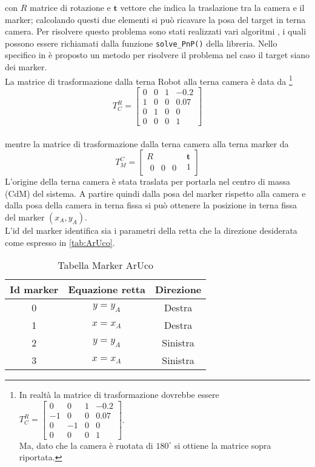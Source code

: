   con $R$ matrice di rotazione e $ \boldsymbol{t}$ vettore che indica la traslazione tra la camera e il marker; calcolando questi due elementi si può ricavare la 
  posa del target in terna camera. Per risolvere questo problema sono stati realizzati vari algoritmi \cite{marchand2015pose}, i quali possono essere richiamati dalla 
  funzione \texttt{solve\_PnP()} della libreria. Nello specifico in \cite{infinitesimal} è proposto un metodo per risolvere il problema nel caso il target siano dei
  marker. \\
  La matrice di trasformazione dalla terna Robot alla terna camera è data da \footnote{In realtà la matrice di trasformazione dovrebbe essere $T^R_C = \begin{bmatrix} 0 & 0 & 1 & -0.2 \\ -1 & 0 & 0 & 0.07 \\ 0 & -1 & 0 & 0 \\ 0 & 0 & 0 & 1 \end{bmatrix} $. \\ Ma, dato che la camera è ruotata di $180^{\circ}$ si ottiene la matrice sopra riportata. }   
\begin{equation}
T^R_C = \begin{bmatrix} 0 & 0 & 1 & -0.2 \\ 1 & 0 & 0 & 0.07 \\ 0 & 1 & 0 & 0 \\ 0 & 0 & 0 & 1 \end{bmatrix} 
\end{equation}\\ mentre la matrice di trasformazione dalla terna camera alla terna marker da 
\begin{equation}
T^C_M = \begin{bmatrix} R & \boldsymbol{t} \\ \begin{matrix} 0 & 0  & 0 \end{matrix} & 1 \end{bmatrix}
\end{equation}
L'origine della terna camera è stata traslata per portarla nel centro di massa (CdM) del sistema.
A partire quindi dalla posa del marker rispetto alla camera e dalla posa della camera in terna fissa si può ottenere la posizione in terna fissa del marker $(x_A, y_A)$.\\
L'id del marker identifica sia i parametri della retta che la direzione desiderata come espresso in 
\autoref{tab:ArUco}.
  \begin{table} [H]
    \centering
    \begin{tabular}{|ccc|}
    \hline
        Id marker & Equazione retta & Direzione \\  \hline
        0 &  $ y = y_A$  & Destra   \\  \hline
        1 &  $ x= x_A $  & Destra\\  \hline
        2 &  $ y = y_A $ & Sinistra\\  \hline
        3 &  $ x = x_A $ & Sinistra\\  \hline
    \end{tabular}
     \caption{Tabella Marker ArUco}
    \label{tab:ArUco}    
\end{table}


